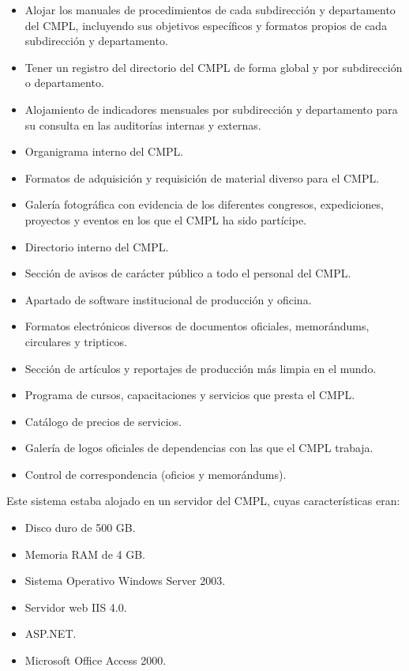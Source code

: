 	\begin{itemize}
		\item Alojar los manuales de procedimientos de cada subdirección y departamento del CMPL, incluyendo sus objetivos específicos y formatos propios de cada subdirección y departamento.
		\item Tener un registro del directorio del CMPL de forma global y por subdirección o departamento. 
		\item Alojamiento de indicadores mensuales por subdirección y departamento para su consulta en las auditorías internas y externas.
		\item Organigrama interno del CMPL.
		\item Formatos de adquisición y requisición de material diverso para el CMPL.
		\item Galería fotográfica con evidencia de los diferentes congresos, expediciones, proyectos y eventos en los que el CMPL ha sido partícipe.
		\item Directorio interno del CMPL.
		\item Sección de avisos de carácter público a todo el personal del CMPL. 
		\item Apartado de software institucional de producción y oficina.
		\item Formatos electrónicos diversos de documentos oficiales, memorándums, circulares y tripticos.
		\item Sección de artículos y reportajes de producción más limpia en el mundo.
		\item Programa de cursos, capacitaciones y servicios que presta el CMPL.
		\item Catálogo de precios de servicios.
		\item Galería de logos oficiales de dependencias con las que el CMPL trabaja.
		\item Control de correspondencia (oficios y memorándums).
	\end{itemize}
	
	Este sistema estaba alojado en un servidor del CMPL, cuyas características eran:
	
	\begin{itemize}
		\item Disco duro de 500 GB.
		\item Memoria RAM de 4 GB.
		\item Sistema Operativo Windows Server 2003.
		\item Servidor web IIS 4.0.
		\item ASP.NET.
		\item Microsoft Office Access 2000.
	\end{itemize}
		

